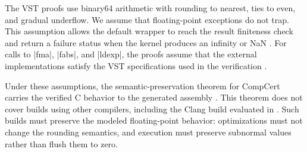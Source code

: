 The VST proofs use binary64 arithmetic with rounding to nearest,
ties to even, and gradual underflow. We assume that floating-point
exceptions do not trap. This assumption allows the default wrapper
to reach the result finiteness check and return a failure status
when the kernel produces an infinity or NaN
\citep{IEEE754-2019}.
For calls to \ccode|fma|, \ccode|fabs|, and \ccode|ldexp|, the
proofs assume that the external implementations satisfy the
VST specifications used in the verification
\citep{Appel2023VSTlib}.

Under these assumptions, the semantic-preservation theorem for
CompCert carries the verified C behavior to the generated assembly
\citep{Leroy2009,Boldo2013CompCert}. This theorem does not cover
builds using other compilers, including the Clang build evaluated
in . Such builds must preserve the modeled
floating-point behavior: optimizations must not change the
rounding semantics, and execution must preserve
subnormal values rather than flush them to zero.

